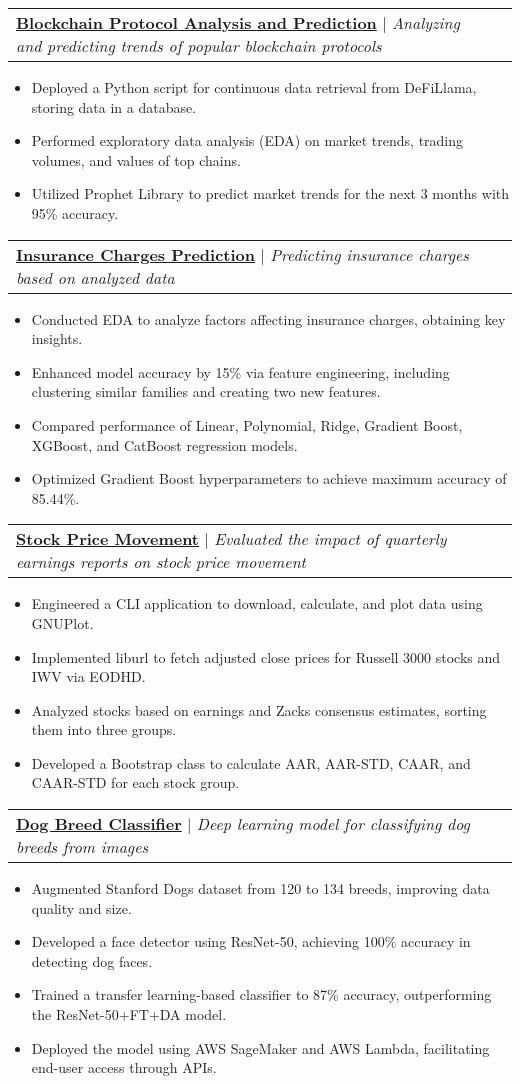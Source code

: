 \documentclass[letterpaper,11pt]{article}
\makeatletter
\newcommand{\resumeItem}[1]{
  \item\small{
    {#1 \vspace{-2pt}}
  }
}
\newcommand{\resumeProjectHeading}[2]{
    \item
    \begin{tabular*}{0.97\textwidth}{l@{\extracolsep{\fill}}r}
      \small#1 & #2 \\
    \end{tabular*}\vspace{-7pt}
}
\newcommand{\resumeItemListStart}{\begin{itemize}}
\newcommand{\resumeItemListEnd}{\end{itemize}\vspace{-5pt}}
\makeatother
\begin{document}
        \resumeProjectHeading
        {\textbf{\href{https://medium.com/@praxs/defillama-curl-python-api-a413b59157b0}{Blockchain Protocol Analysis and Prediction}} $|$ \footnotesize\emph{Analyzing and predicting trends of popular blockchain protocols}}{}
        \resumeItemListStart
            \resumeItem{Deployed a Python script for continuous data retrieval from DeFiLlama, storing data in a database.}
            \resumeItem{Performed exploratory data analysis (EDA) on market trends, trading volumes, and values of top chains.}
            \resumeItem{Utilized Prophet Library to predict market trends for the next 3 months with 95\% accuracy.}
        \resumeItemListEnd

        \resumeProjectHeading
        {\textbf{\href{https://github.com/the-praxs/Insurance-Modeling}{Insurance Charges Prediction}} $|$ \footnotesize\emph{Predicting insurance charges based on analyzed data}}{}
        \resumeItemListStart
            \resumeItem{Conducted EDA to analyze factors affecting insurance charges, obtaining key insights.}
            \resumeItem{Enhanced model accuracy by 15\% via feature engineering, including clustering similar families and creating two new features.}
            \resumeItem{Compared performance of Linear, Polynomial, Ridge, Gradient Boost, XGBoost, and CatBoost regression models.}
            \resumeItem{Optimized Gradient Boost hyperparameters to achieve maximum accuracy of 85.44\%.}
        \resumeItemListEnd

        \resumeProjectHeading
        {\textbf{\href{https://github.com/the-praxs/Stock-Price-Movement}{Stock Price Movement}} $|$ \footnotesize\emph{Evaluated the impact of quarterly earnings reports on stock price movement}}{}
        \resumeItemListStart
            \resumeItem{Engineered a CLI application to download, calculate, and plot data using GNUPlot.}
            \resumeItem{Implemented liburl to fetch adjusted close prices for Russell 3000 stocks and IWV via EODHD.}
            \resumeItem{Analyzed stocks based on earnings and Zacks consensus estimates, sorting them into three groups.}
            \resumeItem{Developed a Bootstrap class to calculate AAR, AAR-STD, CAAR, and CAAR-STD for each stock group.}
        \resumeItemListEnd

        \resumeProjectHeading
        {\textbf{\href{https://github.com/hawk-praxs/dog-breed-classifier}{Dog Breed Classifier}} $|$ \footnotesize\emph{Deep learning model for classifying dog breeds from images}}{}
        \resumeItemListStart
            \resumeItem{Augmented Stanford Dogs dataset from 120 to 134 breeds, improving data quality and size.}
            \resumeItem{Developed a face detector using ResNet-50, achieving 100\% accuracy in detecting dog faces.}
            \resumeItem{Trained a transfer learning-based classifier to 87\% accuracy, outperforming the ResNet-50+FT+DA model.}
            \resumeItem{Deployed the model using AWS SageMaker and AWS Lambda, facilitating end-user access through APIs.}
        \resumeItemListEnd
          
\end{document}
